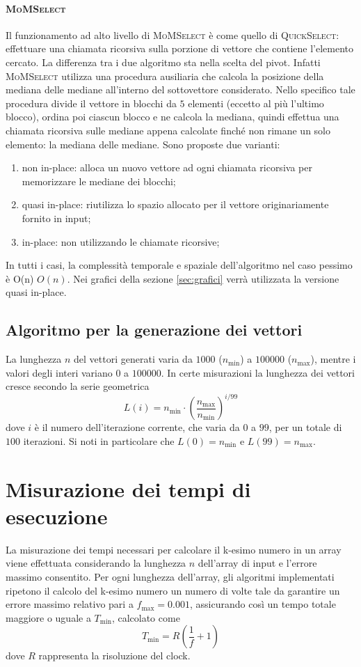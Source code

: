 \documentclass[a4paper]{article}
\newcommand{\QuickSelect}{\textsc{QuickSelect}}
\newcommand{\MoMSelect}{\textsc{MoMSelect}}
\newcommand{\Olin}{\ifmmode O(n) \else $O(n)$\fi} %
\begin{document}
\paragraph{\MoMSelect}
Il funzionamento ad alto livello di \MoMSelect{} è come quello di \QuickSelect: effettuare una chiamata ricorsiva sulla porzione di vettore che contiene l'elemento cercato.
La differenza tra i due algoritmo sta nella scelta del pivot.
Infatti \MoMSelect{} utilizza una procedura ausiliaria che calcola la posizione della mediana delle mediane all'interno del sottovettore considerato.
Nello specifico tale procedura divide il vettore in blocchi da $5$ elementi (eccetto al più l'ultimo blocco), ordina poi ciascun blocco e ne calcola la mediana, quindi effettua una chiamata ricorsiva sulle mediane appena calcolate finché non rimane un solo elemento: la mediana delle mediane.
Sono proposte due varianti:
\begin{enumerate}
    \item non in-place: alloca un nuovo vettore ad ogni chiamata ricorsiva per memorizzare le mediane dei blocchi;
    \item quasi in-place: riutilizza lo spazio allocato per il vettore originariamente fornito in input;
    \item in-place: non utilizzando le chiamate ricorsive;
\end{enumerate}

In tutti i casi, la complessità temporale e spaziale dell'algoritmo nel caso pessimo è \Olin.
Nei grafici della sezione \ref{sec:grafici} verrà utilizzata la versione quasi in-place.

\subsection{Algoritmo per la generazione dei vettori}
La lunghezza $n$ del vettori generati varia da $1000$ ($n_{\min}$) a $100000$ ($n_{\max}$), mentre i valori degli interi variano $0$ a $100000$.
In certe misurazioni la lunghezza dei vettori cresce secondo la serie geometrica
\[
    L(i) = n_{\min} \cdot \left(\frac{n_{\max}}{n_{\min}}\right)^{i/99}
\]
dove $i$ è il numero dell'iterazione corrente, che varia da $0$ a $99$, per un totale di $100$ iterazioni.
Si noti in particolare che $L(0) = n_{\min}$ e $L(99) = n_{\max}$.


\section{Misurazione dei tempi di esecuzione}
\label{sec:misurazione}
La misurazione dei tempi necessari per calcolare il k-esimo numero in un array viene effettuata considerando la lunghezza \( n \) dell'array di input e l'errore massimo consentito. Per ogni lunghezza dell'array, gli algoritmi implementati ripetono il calcolo del k-esimo numero un numero di volte tale da garantire un errore massimo relativo pari a \( f_{\max} = 0.001 \), assicurando così un tempo totale maggiore o uguale a \( T_{\min} \), calcolato come \[ T_{\min} = R \left( \frac{1}{f} + 1 \right) \] dove \( R \) rappresenta la risoluzione del clock.
\end{document}

